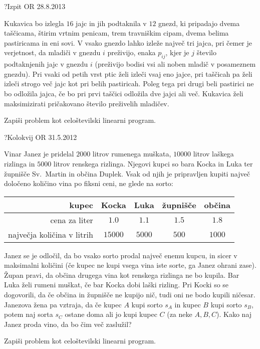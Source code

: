 \begin{naloga}{?}{Izpit OR 28.8.2013}
\begin{vprasanje}
Kukavica bo izlegla $16$ jajc in jih podtaknila v $12$ gnezd,
ki pripadajo dvema taščicama, štirim vrtnim penicam, trem travniškim cipam,
dvema belima pastiricama in eni sovi.
V vsako gnezdo lahko izleže največ tri jajca,
pri čemer je verjetnost, da mladiči v gnezdu $i$ preživijo,
enaka $p_{ij}$, kjer je $j$ število podtaknjenih jajc v gnezdu $i$
(preživijo bodisi vsi ali noben mladič v posameznem gnezdu).
Pri vsaki od petih vrst ptic želi izleči vsaj eno jajce,
pri taščicah pa želi izleči strogo več jajc kot pri belih pastiricah.
Poleg tega pri drugi beli pastirici ne bo odložila jajca,
če bo pri prvi taščici odložila dve jajci ali več.
Kukavica želi maksimizirati pričakovano število preživelih mladičev.

Zapiši problem kot celoštevilski linearni program.
\end{vprasanje}
\begin{odgovor}
\end{odgovor}
\end{naloga}


\begin{naloga}{?}{Kolokvij OR 31.5.2012}
\begin{vprasanje}
Vinar Janez je pridelal $2000$ litrov rumenega muškata,
$10000$ litrov laškega rizlinga in $5000$ litrov renskega rizlinga.
Njegovi kupci so bara Kocka in Luka ter župnišče Sv.~Martin in občina Duplek.
Vsak od njih je pripravljen kupiti največ določeno količino vina
po fiksni ceni, ne glede na sorto:

\begin{center}
\begin{tabular}{r|cccc}
kupec & Kocka & Luka & župnišče & občina \\ \hline
cena za liter & $1.0$ & $1.1$ & $1.5$ & $1.8$ \\
največja količina v litrih & $15000$ & $5000$ & $500$ & $1000$ \\
\end{tabular}
\end{center}

Janez se je odločil, da bo vsako sorto prodal največ enemu kupcu,
in sicer v maksimalni količini
(če kupec ne kupi vsega vina iste sorte, ga Janez ohrani zase).
Župan pravi, da občina drugega vina kot renskega rizlinga ne bo kupila.
Bar Luka želi rumeni muškat, če bar Kocka dobi laški rizling.
Pri Kocki so se dogovorili, da če občina in župnišče ne kupijo nič,
tudi oni ne bodo kupili ničesar.
Janezova žena pa vztraja,
da če kupec $A$ kupi sorto $s_A$ in kupec $B$ kupi sorto $s_B$,
potem naj sorta $s_C$ ostane doma ali jo kupi kupec $C$ (za neke $A, B, C$).
Kako naj Janez proda vino, da bo čim več zaslužil?

Zapiši problem kot celoštevilski linearni program.
\end{vprasanje}
\begin{odgovor}
\end{odgovor}
\end{naloga}

